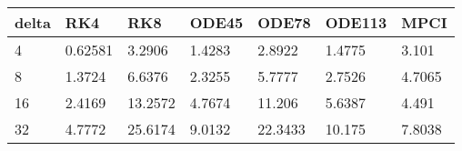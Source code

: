 \begin{tabular}{lllllll}
delta & RK4 & RK8 & ODE45 & ODE78 & ODE113 & MPCI \\ 
\hline 
4 & 0.62581 & 3.2906 & 1.4283 & 2.8922 & 1.4775 & 3.101 \\ 
8 & 1.3724 & 6.6376 & 2.3255 & 5.7777 & 2.7526 & 4.7065 \\ 
16 & 2.4169 & 13.2572 & 4.7674 & 11.206 & 5.6387 & 4.491 \\ 
32 & 4.7772 & 25.6174 & 9.0132 & 22.3433 & 10.175 & 7.8038 \\ 
\hline 
\end{tabular}